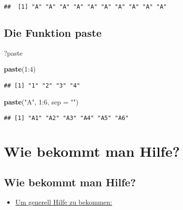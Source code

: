 \documentclass[]{article}
\newenvironment{Shaded}{\begin{snugshade}}{\end{snugshade}}
\newcommand{\KeywordTok}[1]{\textcolor[rgb]{0.13,0.29,0.53}{\textbf{{#1}}}}
\newcommand{\DataTypeTok}[1]{\textcolor[rgb]{0.13,0.29,0.53}{{#1}}}
\newcommand{\DecValTok}[1]{\textcolor[rgb]{0.00,0.00,0.81}{{#1}}}
\newcommand{\StringTok}[1]{\textcolor[rgb]{0.31,0.60,0.02}{{#1}}}
\newcommand{\NormalTok}[1]{{#1}}
\providecommand{\tightlist}{%
  \setlength{\itemsep}{0pt}\setlength{\parskip}{0pt}}
\begin{document}
\begin{verbatim}
##  [1] "A" "A" "A" "A" "A" "A" "A" "A" "A" "A"
\end{verbatim}

\subsection{Die Funktion paste}\label{die-funktion-paste}

\begin{Shaded}
\begin{Highlighting}[]
\NormalTok{?paste}
\end{Highlighting}
\end{Shaded}

\begin{Shaded}
\begin{Highlighting}[]
\KeywordTok{paste}\NormalTok{(}\DecValTok{1}\NormalTok{:}\DecValTok{4}\NormalTok{)}
\end{Highlighting}
\end{Shaded}

\begin{verbatim}
## [1] "1" "2" "3" "4"
\end{verbatim}

\begin{Shaded}
\begin{Highlighting}[]
\KeywordTok{paste}\NormalTok{(}\StringTok{"A"}\NormalTok{, }\DecValTok{1}\NormalTok{:}\DecValTok{6}\NormalTok{, }\DataTypeTok{sep =} \StringTok{""}\NormalTok{)}
\end{Highlighting}
\end{Shaded}

\begin{verbatim}
## [1] "A1" "A2" "A3" "A4" "A5" "A6"
\end{verbatim}

\section{Wie bekommt man Hilfe?}\label{wie-bekommt-man-hilfe}

\subsection{Wie bekommt man Hilfe?}\label{wie-bekommt-man-hilfe-1}

\begin{itemize}
\tightlist
\item
  \href{http://itfeature.com/tag/how-to-get-help-in-r}{Um generell Hilfe
  zu bekommen:}
\end{itemize}
\end{document}
